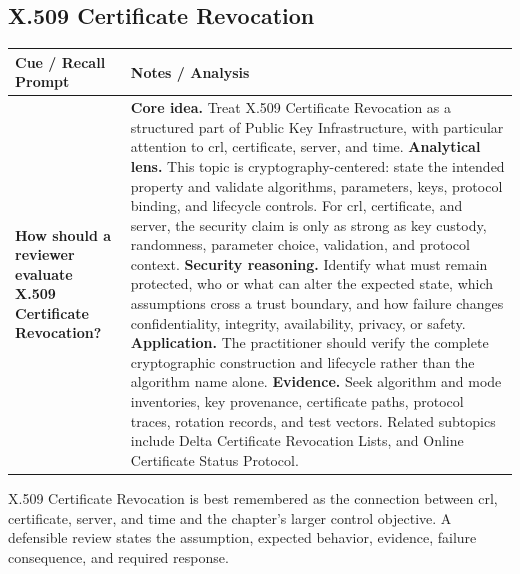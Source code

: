 \documentclass[11pt]{article}
\newcommand{\CornellHeader}{%
\rowcolor{Navy}\color{white}\bfseries Cue / Recall Prompt & \color{white}\bfseries Notes / Analysis\\\hline}
\newcommand{\CornellRow}[2]{%
\cellcolor{CueGray}\RaggedRight\textbf{#1} & \RaggedRight #2\\\hline}
\begin{document}
\subsection*{X.509 Certificate Revocation}
\begin{longtable}{>{\RaggedRight\arraybackslash}p{}|>{\RaggedRight\arraybackslash}p{}}
\CornellHeader
\CornellRow{How should a reviewer evaluate X.509 Certificate Revocation?}{\textbf{Core idea.} Treat X.509 Certificate Revocation as a structured part of Public Key Infrastructure, with particular attention to crl, certificate, server, and time. \textbf{Analytical lens.} This topic is cryptography-centered: state the intended property and validate algorithms, parameters, keys, protocol binding, and lifecycle controls. For crl, certificate, and server, the security claim is only as strong as key custody, randomness, parameter choice, validation, and protocol context. \textbf{Security reasoning.} Identify what must remain protected, who or what can alter the expected state, which assumptions cross a trust boundary, and how failure changes confidentiality, integrity, availability, privacy, or safety. \textbf{Application.} The practitioner should verify the complete cryptographic construction and lifecycle rather than the algorithm name alone. \textbf{Evidence.} Seek algorithm and mode inventories, key provenance, certificate paths, protocol traces, rotation records, and test vectors. Related subtopics include Delta Certificate Revocation Lists, and Online Certificate Status Protocol.}
\end{longtable}
\begin{topicsummary}
X.509 Certificate Revocation is best remembered as the connection between crl, certificate, server, and time and the chapter's larger control objective. A defensible review states the assumption, expected behavior, evidence, failure consequence, and required response.
\end{topicsummary}
\end{document}
